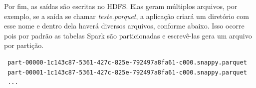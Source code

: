 Por fim, as saídas são escritas no HDFS. Elas geram múltiplos arquivos, por 
exemplo, se a saída se chamar \emph{teste.parquet}, a aplicação criará um 
diretório com esse nome e dentro dela haverá diversos arquivos, conforme abaixo. 
Isso ocorre pois por padrão as tabelas Spark são particionadas e escrevê-las 
gera um arquivo por partição.

\footnotesize
\begin{lstlisting}
 part-00000-1c143c87-5361-427c-825e-792497a8fa61-c000.snappy.parquet
 part-00001-1c143c87-5361-427c-825e-792497a8fa61-c000.snappy.parquet
 ...
\end{lstlisting}






